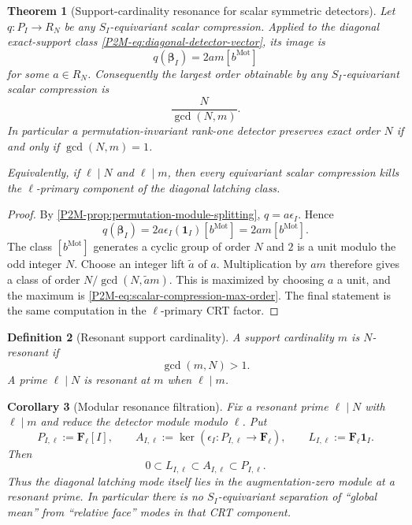 \documentclass[11pt]{article}
\newtheorem{theorem}{Theorem}[section]
\newtheorem{corollary}[theorem]{Corollary}
\newtheorem{definition}[theorem]{Definition}
\theoremstyle{remark}
\newcommand{\F}{\mathbf F}
\newcommand{\Mot}{\mathrm{Mot}}
\begin{document}
\begin{theorem}[Support-cardinality resonance for scalar symmetric detectors]
\label{P2M-thm:cardinality-resonance}
Let $q:P_I\to R_N$ be any $S_I$-equivariant scalar compression.  Applied to
the diagonal exact-support class \eqref{P2M-eq:diagonal-detector-vector}, its image
is
\[
 q(\boldsymbol\beta_I)
 =2a m[b^{\Mot}]
\]
for some $a\in R_N$.  Consequently the largest order obtainable by any
$S_I$-equivariant scalar compression is
\begin{equation}\label{P2M-eq:scalar-compression-max-order}
 \boxed{
 \frac{N}{\gcd(N,m)}.}
\end{equation}
In particular a permutation-invariant rank-one detector preserves exact order
$N$ if and only if $\gcd(N,m)=1$.

Equivalently, if $\ell\mid N$ and $\ell\mid m$, then every equivariant scalar
compression kills the $\ell$-primary component of the diagonal latching
class.
\end{theorem}

\begin{proof}
By \cref{P2M-prop:permutation-module-splitting}, $q=a\epsilon_I$.  Hence
\[
 q(\boldsymbol\beta_I)
 =2a\epsilon_I(\mathbf1_I)[b^{\Mot}]
 =2am[b^{\Mot}].
\]
The class $[b^{\Mot}]$ generates a cyclic group of order $N$ and $2$ is a
unit modulo the odd integer $N$.  Choose an integer lift $\widetilde a$ of
$a$.  Multiplication by $am$ therefore gives a class of order
$N/\gcd(N,\widetilde a m)$.  This is maximized by choosing $a$ a unit,
and the maximum is \eqref{P2M-eq:scalar-compression-max-order}.  The final
statement is the same computation in the $\ell$-primary CRT factor.
\end{proof}

\begin{definition}[Resonant support cardinality]
\label{P2M-def:resonant-support-cardinality}
A support cardinality $m$ is \emph{$N$-resonant} if
\[
 \gcd(m,N)>1.
\]
A prime $\ell\mid N$ is resonant at $m$ when $\ell\mid m$.
\end{definition}

\begin{corollary}[Modular resonance filtration]
\label{P2M-cor:modular-resonance-filtration}
Fix a resonant prime $\ell\mid N$ with $\ell\mid m$ and reduce the detector
module modulo $\ell$.  Put
\[
 P_{I,\ell}:=\F_\ell[I],
 \qquad
 A_{I,\ell}:=\ker\!\left(\epsilon_I:P_{I,\ell}\to\F_\ell\right),
 \qquad
 L_{I,\ell}:=\F_\ell\mathbf1_I.
\]
Then
\begin{equation}
 \boxed{
 0\subset L_{I,\ell}\subset A_{I,\ell}\subset P_{I,\ell}.}
\end{equation}
Thus the diagonal latching mode itself lies in the augmentation-zero module
at a resonant prime.  In particular there is no $S_I$-equivariant separation
of ``global mean'' from ``relative face'' modes in that CRT component.
\end{corollary}
\end{document}
